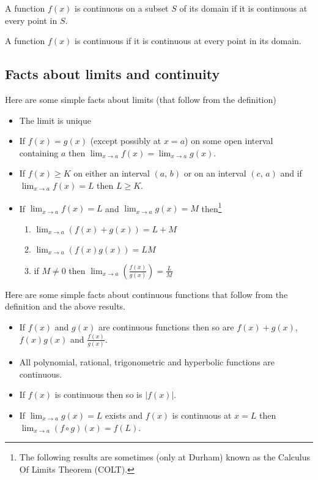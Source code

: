 \documentclass[10pt, a4paper]{article}
\begin{document}
\begin{definition}
    A function $f(x)$ is continuous on a subset $S$ of its domain if it is continuous at every point in $S$.
\end{definition}

\begin{definition}
    A function $f(x)$ is continuous if it is continuous at every point in its domain.
\end{definition}

\subsection{Facts about limits and continuity}
Here are some simple facts about limits (that follow from the definition)

\begin{itemize}
    \item The limit is unique
    \item If $f(x) = g(x)$ (except possibly at $x = a$) on some open interval containing $a$ then $\lim_{x \rightarrow a}f(x) = \lim_{x \rightarrow a}g(x)$.
    \item If $f(x) \geq K$ on either an interval $(a,\,b)$ or on an interval $(c,\,a)$ and if $\lim_{x \rightarrow a}f(x) = L$ then $L \geq K$.

    \item If $\lim_{x \rightarrow a}f(x) = L$ and $\lim_{x \rightarrow a}g(x) = M$ then\footnote{The following results are sometimes (only at Durham) known as the Calculus Of Limits Theorem (COLT).}
    \begin{enumerate}[label = (\roman*)]
        \item $\lim_{x \rightarrow a}(f(x) + g(x)) = L + M$
        \item $\lim_{x \rightarrow a}(f(x)g(x)) = LM$
        \item if $M \neq 0$ then $\lim_{x \rightarrow a}\left(\frac{f(x)}{g(x)}\right) = \frac{L}{M}$
    \end{enumerate}
\end{itemize}

Here are some simple facts about continuous functions that follow from the definition and the above results.

\begin{itemize}
    \item If $f(x)$ and $g(x)$ are continuous functions then so are $f(x) + g(x)$, $f(x)g(x)$ and $\frac{f(x)}{g(x)}$.
    \item All polynomial, rational, trigonometric and hyperbolic functions are continuous.
    \item If $f(x)$ is continuous then so is $|f(x)|$.
    \item If $\lim_{x \rightarrow a}g(x) = L$ exists and $f(x)$ is continuous at $x = L$ then $\lim_{x \rightarrow a}(f \circ g)(x) = f(L)$.
\end{itemize}
\end{document}
